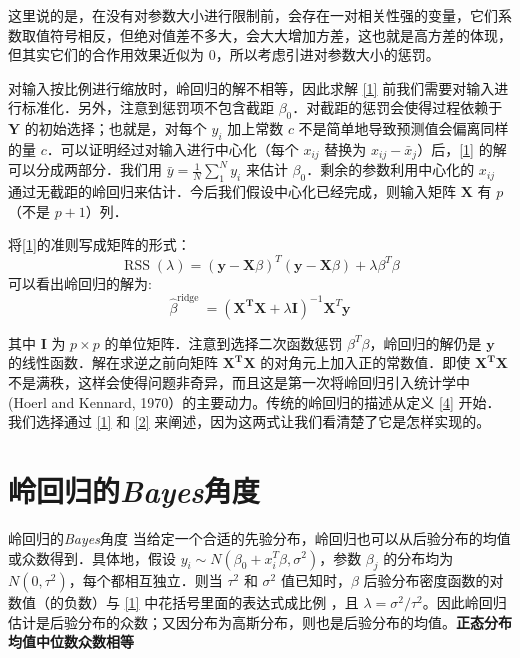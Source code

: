 \documentclass[
  15pt,
  ignorenonframetext,
]{beamer}
\begin{document}
\begin{frame}
这里说的是，在没有对参数大小进行限制前，会存在一对相关性强的变量，它们系数取值符号相反，但绝对值差不多大，会大大增加方差，这也就是高方差的体现，但其实它们的合作用效果近似为
\(0\)，所以考虑引进对参数大小的惩罚。

对输入按比例进行缩放时，岭回归的解不相等，因此求解 \eqref{1}
前我们需要对输入进行标准化．另外，注意到惩罚项不包含截距
\(\beta_0\)．对截距的惩罚会使得过程依赖于 \(\mathbf{Y}\)
的初始选择；也就是，对每个 \(y_i\) 加上常数 \(c\)
不是简单地导致预测值会偏离同样的量
\(c\)．可以证明经过对输入进行中心化（每个 \(x_{ij}\) 替换为
\(x_{ij}-\bar x_j\)）后，\eqref{1} 的解可以分成两部分．我们用
\(\bar y=\frac{1}{N}\sum_1^Ny_i\) 来估计
\(\beta_0\)．剩余的参数利用中心化的 \(x_{ij}\)
通过无截距的岭回归来估计．今后我们假设中心化已经完成，则输入矩阵
\(\mathbf X\) 有 \(p\)（不是 \(p+1\)）列．
\end{frame}

\begin{frame}
将\eqref{1}的准则写成矩阵的形式：
\[\operatorname{RSS}(\lambda)=(\mathbf{y}-\mathbf{X} \beta)^{T}(\mathbf{y}-\mathbf{X} \beta)+\lambda \beta^{T} \beta \tag{3}
\label{3}
\] 可以看出岭回归的解为:
\[\hat{\beta}^{\text {ridge }}=\left(\mathbf{X}^{\mathbf{T}} \mathbf{X}+\lambda \mathbf{I}\right)^{-1} \mathbf{X}^{T} \mathbf{y} 
\tag{4}
\label{4}
\]

其中 \(\mathbf{I}\) 为 \(p\times p\) 的单位矩阵．注意到选择二次函数惩罚
\(\beta^T\beta\)，岭回归的解仍是 \(\mathbf{y}\)
的线性函数．解在求逆之前向矩阵 \(\mathbf{X^TX}\)
的对角元上加入正的常数值．即使 \(\mathbf{X^TX}\)
不是满秩，这样会使得问题非奇异，而且这是第一次将岭回归引入统计学中
(Hoerl and Kennard, 1970）的主要动力。传统的岭回归的描述从定义 \eqref{4}
开始．我们选择通过 \eqref{1} 和 \eqref{2}
来阐述，因为这两式让我们看清楚了它是怎样实现的。
\end{frame}

\hypertarget{ux5cadux56deux5f52ux7684bayesux89d2ux5ea6}{%
\section{\texorpdfstring{岭回归的\emph{Bayes}角度}{岭回归的Bayes角度}}\label{ux5cadux56deux5f52ux7684bayesux89d2ux5ea6}}

\begin{frame}{岭回归的\emph{Bayes}角度}
当给定一个合适的先验分布，岭回归也可以从后验分布的均值或众数得到．具体地，假设
\(y_i \sim N(\beta_0+x^T_i\beta,\sigma^2)\)，参数 \(\beta_j\) 的分布均为
\(N(0,\tau^2)\)，每个都相互独立．则当 \(\tau^2\) 和 \(\sigma^2\)
值已知时，\(\beta\) 后验分布密度函数的对数值（的负数）与 \eqref{1}
中花括号里面的表达式成比例 ，且
\(\lambda=\sigma^2/\tau^2\)。因此岭回归估计是后验分布的众数；又因分布为高斯分布，则也是后验分布的均值。\textbf{正态分布均值中位数众数相等}
\end{frame}
\end{document}

